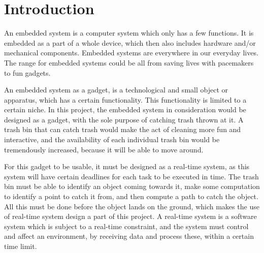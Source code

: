  \chapter{Introduction}
\label{chap:Introduction}
An embedded system is a computer system which only has a few functions. It is embedded as a part of a whole device, which then also includes hardware and/or mechanical components. Embedded systems are everywhere in our everyday lives. The range for embedded systems could be all from saving lives with pacemakers to fun gadgets. \citep{es}

An embedded system as a gadget, is a technological and small object or apparatus, which has a certain functionality. This functionality is limited to a certain niche. \newline
In this project, the embedded system in consideration would be designed as a gadget, with the sole purpose of catching trash thrown at it. A trash bin that can catch trash would make the act of cleaning more fun and interactive, and the availability of each individual trash bin would be tremendously increased, because it will be able to move around.

For this gadget to be usable, it must be designed as a real-time system, as this system will have certain deadlines for each task to be executed in time. The trash bin must be able to identify an object coming towards it, make some computation to identify a point to catch it from, and then compute a path to catch the object. All this must be done before the object lands on the ground, which makes the use of real-time system design a part of this project. A real-time system is a software system which is subject to a real-time constraint, and the system must control and affect an environment, by receiving data and process these, within a certain time limit. 




